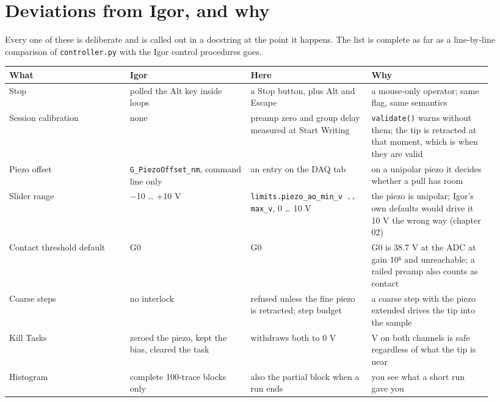\section{Deviations from Igor, and why}

Every one of these is deliberate and is called out in a docstring at the point it happens. The list is complete as far as a line-by-line comparison of \texttt{controller.\discretionary{}{}{}py} with the Igor control procedures goes.

\small\setlength{\LTleft}{0pt}\setlength{\LTright}{\fill}
\begin{longtable}{@{}>{\raggedright\arraybackslash}p{0.230\linewidth}>{\raggedright\arraybackslash}p{0.230\linewidth}>{\raggedright\arraybackslash}p{0.230\linewidth}>{\raggedright\arraybackslash}p{0.230\linewidth}@{}}
\toprule
\textbf{What} & \textbf{Igor} & \textbf{Here} & \textbf{Why} \\
\midrule\endhead
Stop & polled the Alt key inside loops & a Stop button, plus Alt and Escape & a mouse-only operator; same flag, same semantics \\
Session calibration & none & preamp zero and group delay measured at Start Writing & \texttt{validate()} warns without them; the tip is retracted at that moment, which is when they are valid \\
Piezo offset & \texttt{G\_\discretionary{}{}{}Piezo\discretionary{}{}{}Offset\_\discretionary{}{}{}nm}, command line only & an entry on the DAQ tab & on a unipolar piezo it decides whether a pull has room \\
Slider range & −10 \ldots{} +10 V & \texttt{limits.\discretionary{}{}{}piezo\_\discretionary{}{}{}ao\_\discretionary{}{}{}min\_\discretionary{}{}{}v .\discretionary{}{}{}.\discretionary{}{}{} max\_\discretionary{}{}{}v}, 0 \ldots{} 10 V & the piezo is unipolar; Igor's own defaults would drive it 10 V the wrong way (chapter 02) \\
Contact threshold default & 5 G0 & 0.5 G0 & 5 G0 is 38.7 V at the ADC at gain 10⁶ and unreachable; a railed preamp also counts as contact \\
Coarse steps & no interlock & refused unless the fine piezo is retracted; step budget & a coarse step with the piezo extended drives the tip into the sample \\
Kill Tasks & zeroed the piezo, kept the bias, cleared the task & withdraws both to 0 V & 0 V on both channels is safe regardless of what the tip is near \\
Histogram & complete 100-trace blocks only & also the partial block when a run ends & you see what a short run gave you \\

\end{longtable}
